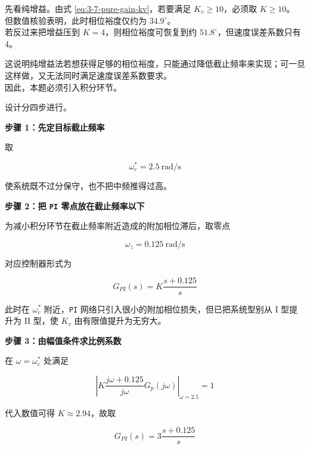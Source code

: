 \documentclass[
  11pt]{article}
\begin{document}
先看纯增益。由式 \ref{eq:3-7-pure-gain-kv}，若要满足
\(K_v \ge 10\)，必须取 \(K \ge 10\)。\\
但数值核验表明，此时相位裕度仅约为 \(34.9^\circ\)。\\
若反过来把增益压到 \(K=4\)，则相位裕度可恢复到约
\(51.8^\circ\)，但速度误差系数只有 4。

这说明纯增益法若想获得足够的相位裕度，只能通过降低截止频率来实现；可一旦这样做，又无法同时满足速度误差系数要求。\\
因此，本题必须引入积分环节。

设计分四步进行。

\textbf{步骤 1：先定目标截止频率}

取

\begin{equation}
\omega_c^\ast = 2.5\ \mathrm{rad/s}
\tag{3-7-41}\label{eq:3-7-wc-target}
\end{equation}

使系统既不过分保守，也不把中频推得过高。

\textbf{步骤 2：把 \texttt{PI} 零点放在截止频率以下}

为减小积分环节在截止频率附近造成的附加相位滞后，取零点

\begin{equation}
\omega_z=0.125\ \mathrm{rad/s}
\tag{3-7-42}\label{eq:3-7-pi-zero}
\end{equation}

对应控制器形式为

\begin{equation}
G_{PI}(s)=K\frac{s+0.125}{s}
\tag{3-7-43}\label{eq:3-7-frequency-pi-general}
\end{equation}

此时在 \(\omega_c^\ast\) 附近，\texttt{PI}
网络只引入很小的附加相位损失，但已把系统型别从 I 型提升为 II 型，使
\(K_v\) 由有限值提升为无穷大。

\textbf{步骤 3：由幅值条件求比例系数}

在 \(\omega=\omega_c^\ast\) 处满足

\begin{equation}
\left|K\frac{j\omega+0.125}{j\omega}G_p(j\omega)\right|_{\omega=2.5}=1
\tag{3-7-44}\label{eq:3-7-pi-magnitude}
\end{equation}

代入数值可得 \(K \approx 2.94\)，故取

\begin{equation}
G_{PI}(s)=3\frac{s+0.125}{s}
\tag{3-7-45}\label{eq:3-7-frequency-pi-final}
\end{equation}
\end{document}
